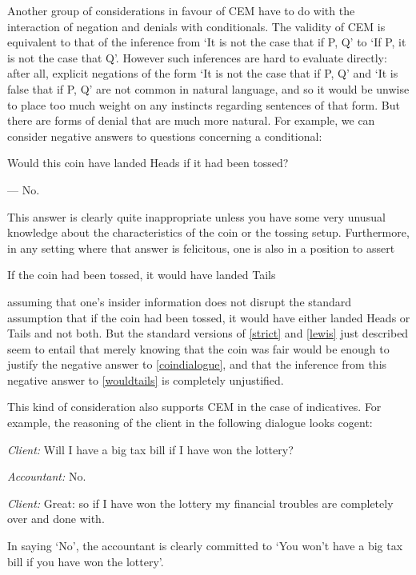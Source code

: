\documentclass[leqno, 11pt, a5paper, openany]{article}
\begin{document}
Another group of considerations in favour of CEM have to do with the interaction of negation and denials with conditionals. The validity of CEM is equivalent to that of the inference from ‘It is not the case that if P, Q’ to ‘If P, it is not the case that Q’. However such inferences are hard to evaluate directly: after all, explicit negations of the form ‘It is not the case that if P, Q’ and ‘It is false that if P, Q’ are not common in natural language, and so it would be unwise to place too much weight on any instincts regarding sentences of that form. But there are forms of denial that are much more natural. For example, we can consider negative answers to questions concerning a conditional:
\begin{prop}
\nitem \label{coindialogue}
  \begin{prop}
      \item
		 Would this coin have landed Heads if it had been tossed?
		 \item
		 --- No.
  \end{prop}
\end{prop}
This answer is clearly quite inappropriate unless you have some very unusual knowledge about the characteristics of the coin or the tossing setup. Furthermore, in any setting where that answer is felicitous, one is also in a position to assert
\begin{prop}
\nitem \label{wouldtails}
  If the coin had been tossed, it would have landed Tails
\end{prop}
assuming that one's insider information does not disrupt the standard assumption that if the coin had been tossed, it would have either landed Heads or Tails and not both. But the standard versions of \ref{strict} and \ref{lewis} just described seem to entail that merely knowing that the coin was fair would be enough to justify the negative answer to \ref{coindialogue}, and that the inference from this negative answer to \ref{wouldtails} is completely unjustified.

This kind of consideration also supports CEM in the case of indicatives. For example, the reasoning of the client in the following dialogue looks cogent:
\begin{prop}
	\nitem \label{taxdialogue}
		\emph{Client:} Will I have a big tax bill if I have won the lottery?

		\emph{Accountant:} No.

		\emph{Client:} Great: so if I have won the lottery my financial
		troubles are completely over and done with.
\end{prop}
In saying ‘No’, the accountant is clearly committed to `You won't have a
big tax bill if you have won the lottery'.
\end{document}
